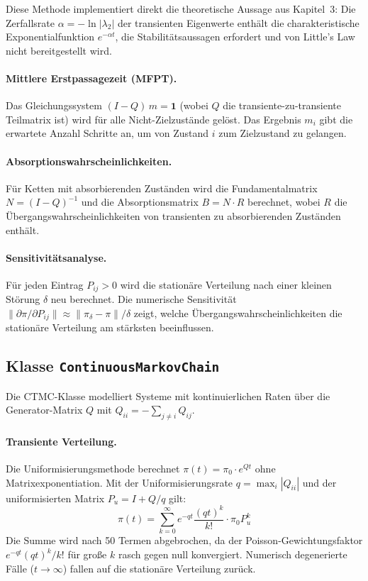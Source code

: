 ﻿\documentclass[a4paper,12pt]{report}
\theoremstyle{definition}
\begin{document}
Diese Methode implementiert direkt die theoretische Aussage aus Kapitel~3:
Die Zerfallsrate $\alpha = -\ln|\lambda_2|$ der transienten Eigenwerte
enthält die charakteristische Exponentialfunktion $e^{-\alpha t}$, die
Stabilitätsaussagen erfordert und von Little's Law nicht bereitgestellt wird.

\paragraph{Mittlere Erstpassagezeit (MFPT).}
Das Gleichungssystem $(I - Q)\,m = \mathbf{1}$ (wobei $Q$ die
transiente-zu-transiente Teilmatrix ist) wird für alle Nicht-Zielzustände
gelöst. Das Ergebnis $m_i$ gibt die erwartete Anzahl Schritte an, um von
Zustand $i$ zum Zielzustand zu gelangen.

\paragraph{Absorptionswahrscheinlichkeiten.}
Für Ketten mit absorbierenden Zuständen wird die Fundamentalmatrix
$N = (I-Q)^{-1}$ und die Absorptionsmatrix $B = N \cdot R$ berechnet,
wobei $R$ die Übergangswahrscheinlichkeiten von transienten zu
absorbierenden Zuständen enthält.

\paragraph{Sensitivitätsanalyse.}
Für jeden Eintrag $P_{ij} > 0$ wird die stationäre Verteilung nach einer
kleinen Störung $\delta$ neu berechnet. Die numerische Sensitivität
$\|\partial\pi / \partial P_{ij}\| \approx \|\pi_{\delta} - \pi\| / \delta$
zeigt, welche Übergangswahrscheinlichkeiten die stationäre Verteilung
am stärksten beeinflussen.

\subsection{Klasse \texttt{ContinuousMarkovChain}}

Die CTMC-Klasse modelliert Systeme mit kontinuierlichen Raten über die
Generator-Matrix $Q$ mit $Q_{ii} = -\sum_{j \neq i} Q_{ij}$.

\paragraph{Transiente Verteilung.}
Die Uniformisierungsmethode berechnet $\pi(t) = \pi_0 \cdot e^{Qt}$
ohne Matrixexponentiation. Mit der Uniformisierungsrate $q = \max_i |Q_{ii}|$
und der uniformisierten Matrix $P_u = I + Q/q$ gilt:
\begin{equation}
	\pi(t) = \sum_{k=0}^{\infty} e^{-qt} \frac{(qt)^k}{k!} \cdot \pi_0 P_u^k
\end{equation}
Die Summe wird nach 50 Termen abgebrochen, da der Poisson-Gewichtungsfaktor
$e^{-qt}(qt)^k/k!$ für große $k$ rasch gegen null konvergiert. Numerisch
degenerierte Fälle ($t \to \infty$) fallen auf die stationäre Verteilung zurück.
\end{document}
